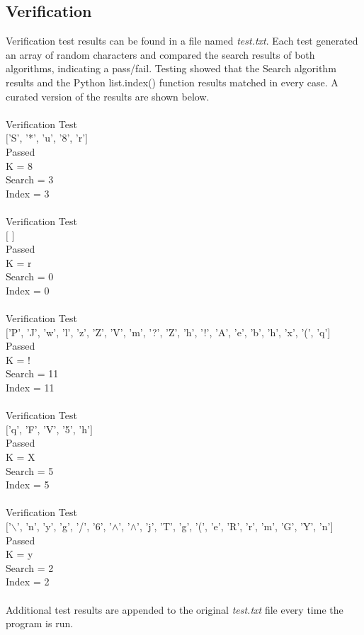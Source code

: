 \documentclass{article}
\begin{document}
\subsection{Verification}
Verification test results can be found in a file named \textit{test.txt}. Each test generated an array of random characters and compared the search results of both algorithms, indicating a pass/fail. Testing showed that the Search algorithm results and the Python list.index() function results matched in every case. A curated version of the results are shown below. \\ \\
\ttfamily
Verification Test \\
$[$'S', '*', 'u', '8', 'r'$]$ \\
Passed \\
K = 8 \\
Search =  3 \\
Index =  3 \\
\\
Verification Test \\
$[$ $]$ \\
Passed \\
K = r \\
Search =  0 \\
Index =  0 \\
 \\
Verification Test \\
$[$'P', 'J', 'w', 'l', 'z', 'Z', 'V', 'm', '?', 'Z', 'h', '!', 'A', 'e', 'b', 'h', 'x', '(', 'q'$]$ \\
Passed \\
K = ! \\
Search =  11 \\
Index =  11 \\
\\
Verification Test \\
$[$'q', 'F', 'V', '5', 'h'$]$ \\
Passed \\
K = X \\
Search =  5 \\
Index =  5 \\
\\
Verification Test \\
$[$'$\backslash$', 'n', 'y', 'g', '/', '6', '$\wedge$', '$\wedge$', 'j', 'T', 'g', '(', 'e', 'R', 'r', 'm', 'G', 'Y', 'n'$]$ \\
Passed \\
K = y \\
Search =  2 \\
Index =  2 \\
\\
\rmfamily
Additional test results are appended to the original \textit{test.txt} file every time the program is run.
\end{document}
